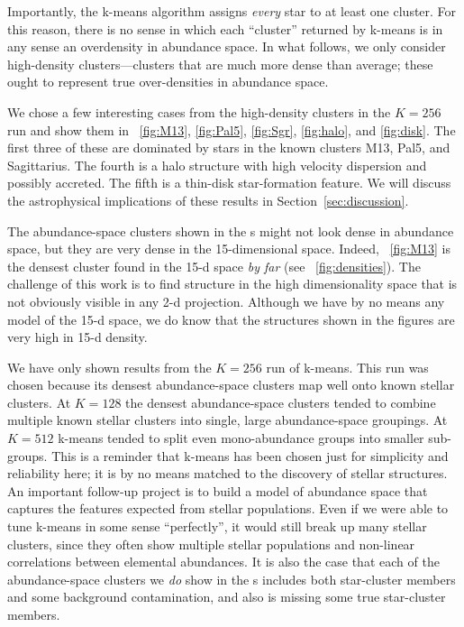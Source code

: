 \documentclass[12pt, letterpaper, preprint]{aastex}
\newcommand{\sectionname}{Section}
\begin{document}
Importantly, the k-means algorithm assigns \emph{every} star to at
least one cluster.
For this reason, there is no sense in which each ``cluster'' returned
by k-means is in any sense an overdensity in abundance space.
In what follows, we only consider high-density clusters---clusters
that are much more dense than average; these ought to represent true
over-densities in abundance space.


We chose a few interesting cases from the high-density clusters
in the $K=256$ run and show them in
\figurename~\ref{fig:M13}, \ref{fig:Pal5}, \ref{fig:Sgr},
\ref{fig:halo}, and \ref{fig:disk}.
The first three of these are dominated by stars in the known clusters
M13, Pal5, and Sagittarius.
The fourth is a halo structure with high velocity dispersion and
possibly accreted.
The fifth is a thin-disk star-formation feature.
We will discuss the astrophysical implications of these results in
\sectionname~\ref{sec:discussion}.

The abundance-space clusters shown in the \figurename s
might not look dense in abundance space, but they
are very dense in the 15-dimensional space.  Indeed,
\figurename~\ref{fig:M13} is the densest cluster found in the 15-d
space \emph{by far} (see \figurename~\ref{fig:densities}).
The challenge of this work is to find structure in the high
dimensionality space that is not obviously visible in any 2-d projection.
Although we have by no means any model of the 15-d space, we do know
that the structures shown in the figures are very high in 15-d
density.

We have only shown results from the $K=256$ run of k-means.
This run was chosen because its densest abundance-space clusters map
well onto known stellar clusters.
At $K=128$ the densest abundance-space clusters tended to combine
multiple known stellar clusters into single, large abundance-space
groupings.
At $K=512$ k-means tended to split even mono-abundance groups into
smaller sub-groups.
This is a reminder that k-means has been chosen just for simplicity
and reliability here; it is by no means matched to the discovery of
stellar structures.
An important follow-up project is to build a model of abundance space
that captures the features expected from stellar populations.
Even if we were able to tune k-means in some sense ``perfectly'', it
would still break up many stellar clusters, since they often show
multiple stellar populations and non-linear correlations between elemental abundances.
It is also the case that each of the abundance-space clusters we
\emph{do} show in the \figurename s includes both star-cluster members
and some background contamination, and also is missing some true
star-cluster members.
\end{document}
